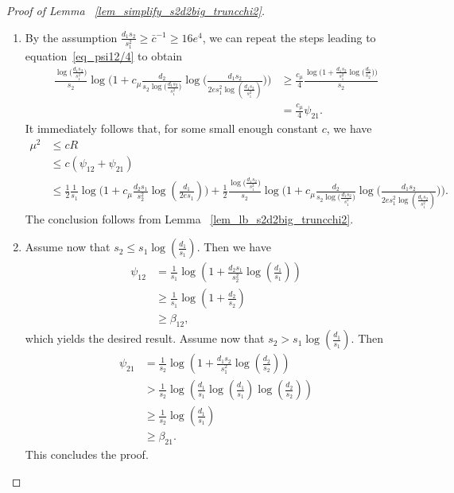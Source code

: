 \documentclass{article}
\theoremstyle{remark}
\begin{document}
\begin{proof}[Proof of Lemma ~\ref{lem_simplify_s2d2big_truncchi2}]
\phantom{}

\begin{enumerate}
    \item 
    By the assumption $\frac{d_1s_2}{s_1^2} \geq \bar{c}^{-1} \geq 16e^4$, 
    we can repeat the steps leading to equation~\eqref{eq_psi12/4} to obtain 
    \begin{align*}
         \frac{\log\big(\frac{d_1s_2}{s_1^2}\big)}{s_2}\log\Big(1 + c_\mu \frac{d_2}{s_2\log\big(\frac{d_1s_2}{s_1^2}\big)}\log \big(\frac{d_1s_2}{2es_1^2\log(\frac{d_1s_2}{s_1^2})}\big)\Big)&\geq \frac{c_\mu}{4}\frac{\log\Big(1 + \frac{d_1s_2}{s_1^2}\log\big(\frac{d_2}{s_2}\big)\Big)}{s_2} \\
    &= \frac{c_\mu}{4} \psi_{21}.
    \end{align*}
    It immediately follows that, for some small enough constant $c$, we have 
    \begin{align*}
        \mu^2 &\leq cR \\
        &\leq c(\psi_{12} + \psi_{21}) \\
        &\leq \frac{1}{2}\frac{1}{s_1}\log\Big(1 + c_\mu \frac{d_2s_1}{s_2^2}\log(\frac{d_1}{2es_1})\Big) + \frac12 \frac{\log\big(\frac{d_1s_2}{s_1^2}\big)}{s_2}\log\Big(1 + c_\mu \frac{d_2}{s_2\log\big(\frac{d_1s_2}{s_1^2}\big)}\log \big(\frac{d_1s_2}{2es_1^2\log(\frac{d_1s_2}{s_1^2})}\big)\Big).
    \end{align*}
    The conclusion follows from Lemma ~\ref{lem_lb_s2d2big_truncchi2}.
    \item Assume now that $s_2 \leq s_1 \log\left(\frac{d_1}{s_1}\right)$. 
    Then we have
    \begin{align*}
        \psi_{12} &= \frac{1}{s_1} \log\left(1+\frac{d_2s_1}{s_2^2} \log\left(\frac{d_1}{s_1}\right)\right)\\
        & \geq \frac{1}{s_1} \log\left(1+\frac{d_2}{s_2} \right)\\
        & \geq \beta_{12}, 
    \end{align*}
    which yields the desired result. 
    Assume now that $s_2 > s_1 \log\left(\frac{d_1}{s_1}\right)$. 
    Then
    \begin{align*}
        \psi_{21} &= \frac{1}{s_2} \log\left(1+\frac{d_1s_2}{s_1^2} \log\left(\frac{d_2}{s_2}\right)\right)\\
        & > \frac{1}{s_2} \log\left(\frac{d_1}{s_1}\log\left(\frac{d_1}{s_1}\right)\log\left(\frac{d_2}{s_2}\right)\right)\\
        & \geq \frac{1}{s_2}\log\left(\frac{d_1}{s_1}\right)\\
        & \geq \beta_{21}.
    \end{align*}
    This concludes the proof.
    \end{enumerate}
\end{proof}
\end{document}
